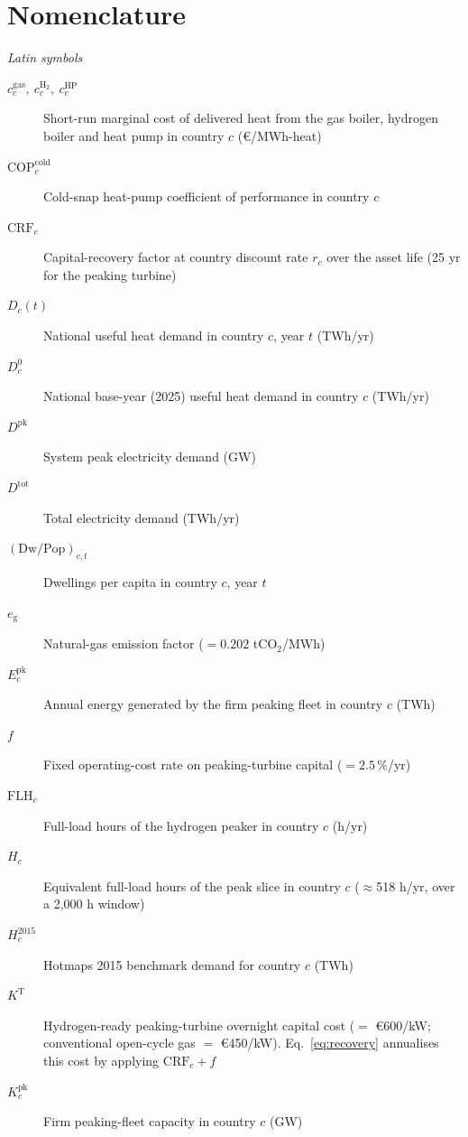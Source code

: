 \documentclass[review]{elsarticle}
\begin{document}
\clearpage
\section*{Nomenclature}

\textit{Latin symbols}
\begin{description}
 \item[$c^{\mathrm{gas}}_{c},\ c^{\mathrm{H_2}}_{c},\ c^{\mathrm{HP}}_{c}$] Short-run marginal cost of delivered heat from the gas boiler, hydrogen boiler and heat pump in country $c$ (\euro{}/MWh-heat)
 \item[$\mathrm{COP}^{\mathrm{cold}}_{c}$] Cold-snap heat-pump coefficient of performance in country $c$
 \item[$\mathrm{CRF}_{c}$] Capital-recovery factor at country discount rate $r_{c}$ over
the asset life (25 yr for the peaking turbine)
 \item[$D_{c}(t)$] National useful heat demand in country $c$, year $t$ (TWh/yr)
 \item[$D_{c}^{0}$] National base-year (2025) useful heat demand in country $c$ (TWh/yr)
 \item[$D^{\mathrm{pk}}$] System peak electricity demand (GW)
 \item[$D^{\mathrm{tot}}$] Total electricity demand (TWh/yr)
 \item[$(\mathrm{Dw}/\mathrm{Pop})_{c,t}$] Dwellings per capita in country $c$, year $t$
 \item[$e_{\mathrm{g}}$] Natural-gas emission factor ($=0.202$ tCO$_2$/MWh)
  \item[$E^{\mathrm{pk}}_{c}$] Annual energy generated by the firm peaking fleet in country $c$ (TWh)
 \item[$f$] Fixed operating-cost rate on peaking-turbine capital ($=2.5\,\%$/yr)
 \item[$\mathrm{FLH}_{c}$] Full-load hours of the hydrogen peaker in country $c$ (h/yr)
 \item[$H_{c}$] Equivalent full-load hours of the peak slice in country $c$ ($\approx$518 h/yr, over a 2{,}000 h window)
 \item[$H_{c}^{2015}$] Hotmaps 2015 benchmark demand for country $c$ (TWh)
 \item[$K^{\mathrm{T}}$] Hydrogen-ready peaking-turbine overnight capital cost ($=$
\euro{}600/kW; conventional open-cycle gas $=$ \euro{}450/kW). Eq.~\eqref{eq:recovery}
annualises this cost by applying $\mathrm{CRF}_{c}+f$
 \item[$K^{\mathrm{pk}}_{c}$] Firm peaking-fleet capacity in country $c$ (GW)

\end{description}
\end{document}
